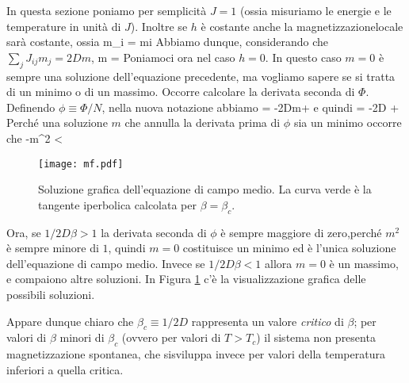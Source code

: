 In questa sezione poniamo per semplicità $J=1$ (ossia misuriamo le energie e le
temperature in unità di $J$). Inoltre se $h$ è costante anche la magnetizzazionelocale sarà costante, ossia
\be
m_{i} = m\quad\quad\forall i
\ee
Abbiamo dunque, considerando che $\sum_{j}J_{ij}m_{j} = 2Dm$, 
\be
m = \tanh[\beta(2Dm + h)]
\ee
Poniamoci ora nel caso $h=0$. In questo caso $m=0$ è sempre una soluzione
dell'equazione precedente, ma vogliamo sapere se si tratta di un minimo o di un
massimo. Occorre calcolare la derivata seconda di $\Phi$. Definendo
$\phi\equiv\Phi/N$, nella nuova notazione abbiamo
\be
\label{eq:derprima}
 = -2Dm+\ln{}
\ee
e quindi
\be
{} = -2D +
\ee
Perché una soluzione $m$ che annulla la derivata prima di $\phi$ sia un minimo
occorre che
-m^{2} < 
\ee
\begin{figure}[!ht]
  \centering
  \texttt{[image: mf.pdf]}
\caption{Soluzione grafica dell'equazione di campo medio. La curva verde è la
tangente iperbolica calcolata per $\beta = \beta_{c}$.}
  \label{fig:mf}
\end{figure}

Ora, se $1/2D\beta > 1$ la derivata seconda di $\phi$ è sempre maggiore di zero,perché $m^{2}$ è sempre minore di $1$, quindi $m=0$ costituisce un minimo ed è
l'unica soluzione dell'equazione di campo medio. Invece se $1/2D\beta < 1$
allora $m=0$ è un massimo, e compaiono altre soluzioni. In Figura \ref{fig:mf}
c'è la visualizzazione grafica delle possibili soluzioni.

Appare dunque chiaro che $\beta_{c}\equiv 1/2D$ rappresenta un valore {\em
critico} di $\beta$; per valori di $\beta$ minori di $\beta_{c}$ (ovvero per
valori di $T > T_{c}$) il sistema non presenta magnetizzazione spontanea, che sisviluppa invece per valori della temperatura inferiori a quella critica.

